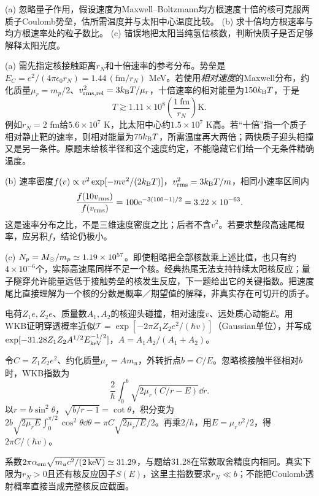 \begin{exercise}
(a) 忽略量子作用，假设速度为Maxwell--Boltzmann均方根速度十倍的核可克服两质子Coulomb势垒，估所需温度并与太阳中心温度比较。
(b) 求十倍均方根速率与均方根速率处的粒子数比。
(c) 错误地把太阳当纯氢估核数，判断快质子是否足够解释太阳光度。
\end{exercise}
\begin{solution}
(a) 需先指定核接触距离$r_N$和十倍速率的参考分布。势垒是$E_C=e^2/(4\pi\epsilon_0r_N)=1.44\,(\mathrm{fm}/r_N)$ MeV。若使用\emph{相对速度}的Maxwell分布，约化质量$\mu_r=m_p/2$、$v_{\rm rms,rel}^2=3k_{\mathrm B} T/\mu_r$，十倍速率的相对能量为$150k_{\mathrm B} T$，于是
\[
 T\gtrsim1.11\times10^8\left(\frac{1\ \mathrm{fm}}{r_N}\right)\mathrm K.
\]
例如$r_N=2$ fm给$5.6\times10^7$ K，比太阳中心约$1.5\times10^7$ K高。若“十倍”指一个质子相对静止靶的速率，则相对能量为$75k_{\mathrm B} T$，所需温度再大两倍；两快质子迎头相撞又是另一条件。原题未给核半径和这个速度约定，不能隐藏它们给一个无条件精确温度。

(b) 速率密度$f(v)\propto v^2\exp[-mv^2/(2k_{\mathrm B} T)]$，$v_{\rm rms}^2=3k_{\mathrm B} T/m$，相同小速率区间内
\[
 \frac{f(10v_{\rm rms})}{f(v_{\rm rms})}
 =100\mathrm e^{-3(100-1)/2}=3.22\times10^{-63}.
\]
这是速率分布之比，不是三维速度密度之比；后者不含$v^2$。若要求整段高速尾概率，应另积$f$，结论仍极小。

(c) $N_p=M_{\odot}/m_p\simeq1.19\times10^{57}$。即使粗略把全部核数乘上述比值，也只有约$4\times10^{-6}$个，实际高速尾同样不足一个核。经典热尾无法支持持续太阳核反应；量子隧穿允许能量远低于接触势垒的核发生反应，下一题给出它的关键指数。把速度尾比直接理解为一个核的分数是概率／期望值的解释，非真实存在可切开的质子。
\end{solution}

\begin{exercise}
电荷$Z_1e,Z_2e$、质量数$A_1,A_2$的核迎头碰撞，相对速度$v$、远处质心动能$E$。用WKB证明穿透概率近似$\mathcal T=\exp[-2\pi Z_1Z_2e^2/(\hbar v)]$（Gaussian单位），并写成$\exp[-31.28Z_1Z_2A^{1/2}E_{\rm keV}^{-1/2}]$，$A=A_1A_2/(A_1+A_2)$。
\end{exercise}
\begin{solution}
令$C=Z_1Z_2e^2$、约化质量$\mu_r=Am_u$，外转折点$b=C/E$。忽略核接触半径相对$b$时，WKB指数为
\[
 \frac2\hbar\int_0^b\sqrt{2\mu_r(C/r-E)}\dd r.
\]
以$r=b\sin^2\theta$，$\sqrt{b/r-1}=\cot\theta$，积分变为
$2b\sqrt{2\mu_rE}\int_0^{\pi/2}\cos^2\theta\dd\theta
=\pi C\sqrt{2\mu_r/E}/2$。再乘$2/\hbar$，用$E=\mu_rv^2/2$，得$2\pi C/(\hbar v)$。

系数$2\pi\alpha_{\rm em}\sqrt{m_uc^2/(2\,\mathrm{keV})}\simeq31.29$，与题给31.28在常数取舍精度内相同。真实下限为$r_N>0$且还有核反应因子$S(E)$，这里主指数要求$r_N\ll b$；不能把Coulomb透射概率直接当成完整核反应截面。
\end{solution}

